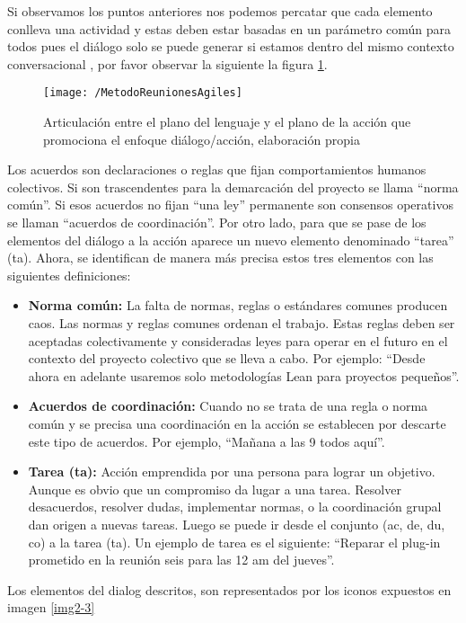 Si observamos los puntos anteriores nos podemos percatar que cada elemento conlleva una actividad y estas deben estar basadas en un parámetro común para todos pues el diálogo solo se puede generar si estamos dentro del mismo contexto conversacional ,  por favor observar la siguiente la figura \ref{img2-2}.

\begin{figure}[h]
\centering
\texttt{[image: /MetodoReunionesAgiles]}
\caption{Articulación entre el plano del lenguaje y el plano de la acción que promociona el enfoque diálogo/acción, elaboración propia} 
\label{img2-2}
\end{figure}

Los acuerdos son declaraciones o reglas que fijan comportamientos humanos colectivos. Si son trascendentes para la demarcación del proyecto se llama “norma común”. Si esos acuerdos no fijan “una ley” permanente son consensos operativos se llaman “acuerdos de coordinación”. Por otro lado, para que se pase de los elementos del diálogo a la acción aparece un nuevo elemento denominado “tarea” (ta). Ahora, se identifican de manera más precisa estos tres elementos con las siguientes definiciones:

\begin{itemize}
	\item \textbf{Norma común:} La falta de normas, reglas o estándares comunes producen caos. Las normas y reglas comunes ordenan el trabajo. Estas reglas deben ser aceptadas colectivamente y consideradas leyes para operar en el futuro en el contexto del proyecto colectivo que se lleva a cabo. Por ejemplo: “Desde ahora en adelante usaremos solo metodologías Lean para proyectos pequeños”.
	\item \textbf{Acuerdos de coordinación:} Cuando no se trata de una regla o norma común y se precisa una coordinación en la acción se establecen por descarte este tipo de acuerdos. Por ejemplo, “Mañana a las 9 todos aquí”.
	\item \textbf{Tarea (ta):} Acción emprendida por una persona para lograr un objetivo. Aunque es obvio que un compromiso da lugar a una tarea. Resolver desacuerdos, resolver dudas, implementar normas, o la coordinación grupal dan origen a nuevas tareas. Luego se puede ir desde el conjunto (ac, de, du, co) a la tarea (ta). Un ejemplo de tarea es el siguiente: “Reparar el plug-in prometido en la reunión seis para las 12 am del jueves”.
\end{itemize}

Los elementos del dialog descritos, son representados por los iconos expuestos en imagen \ref{img2-3}

